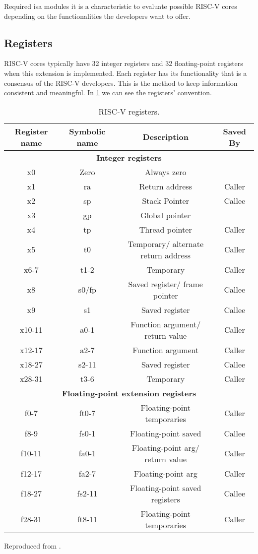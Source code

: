 Required \gls{isa} modules it is a characteristic to evaluate possible RISC-V cores depending on the functionalities the developers want to offer.

\subsection{Registers}
RISC-V cores typically have 32 integer registers and 32 floating-point registers when this extension is implemented. Each register has its functionality that is a consensus of the RISC-V developers. This is the method to keep information consistent and meaningful. In \ref{tab:riscreg} we can see the registers' convention.


\begin{table}[H]
\centering
\begin{tabular}{|c|c|c|c|}
\hline
\textbf{Register name} & \textbf{Symbolic name} & \textbf{Description}  & \textbf{Saved By}  \\ \hline
\multicolumn{4}{|c|}{\textbf{Integer registers}} \\ \hline
x0 & Zero & Always zero & \\ \hline
x1 & ra & Return address & Caller \\ \hline
x2 & sp & Stack Pointer & Callee \\ \hline
x3 & gp & Global pointer &  \\ \hline
x4 & tp & Thread pointer & Caller \\ \hline
x5 & t0 & Temporary/ alternate return address & Caller \\ \hline
x6-7 & t1-2  & Temporary & Caller \\ \hline
x8 & s0/fp & Saved register/ frame pointer & Callee \\ \hline
x9 & s1 & Saved register & Callee \\ \hline
x10-11 & a0-1 & Function argument/ return value & Caller \\ \hline
x12-17 & a2-7 & Function argument & Caller \\ \hline
x18-27 & s2-11 & Saved register & Callee \\ \hline
x28-31 & t3-6 & Temporary & Caller \\ \hline
\multicolumn{4}{|c|}{\textbf{Floating-point extension registers}} \\ \hline
f0-7 & ft0-7 & Floating-point temporaries & Caller \\ \hline
f8-9 & fs0-1 & Floating-point saved & Callee \\ \hline
f10-11 & fa0-1 & Floating-point arg/ return value & Caller \\ \hline
f12-17 & fa2-7 & Floating-point arg & Caller \\ \hline
f18-27 & fs2-11 & Floating-point saved registers & Callee \\ \hline
f28-31 & ft8-11 & Floating-point temporaries & Caller \\ \hline
\end{tabular}
\caption{RISC-V registers.} Reproduced from \cite{riscvg}.
\label{tab:riscreg}
\end{table}

